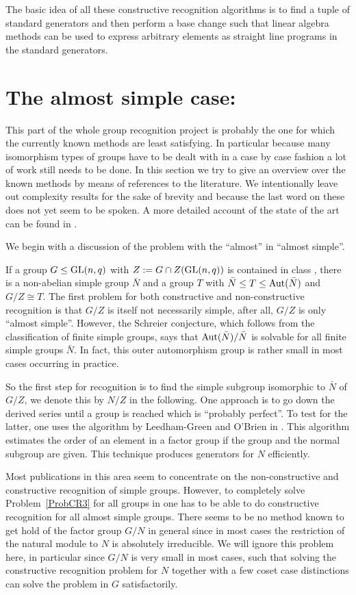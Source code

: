 The basic idea of all these constructive recognition algorithms is to find
a tuple of standard generators and then perform a base change
such that linear algebra methods can be used to express arbitrary
elements as straight line programs in the standard generators.


\section{The almost simple case: }
\label{solveD9}

This part of the whole group recognition project is probably the one
for which the currently known methods are least satisfying. In particular
because many isomorphism types of groups have to be dealt with in a case by
case fashion a lot of work still needs to be done.
In this section we try to give an overview over the known methods by
means of references to the literature. We intentionally leave out
complexity results for the sake of brevity and because the last word on
these does not yet seem to be spoken. A more detailed account of
the state of the art can be found in \cite{towards}.

We begin with a discussion of the problem with the ``almost'' in
``almost simple''.

If a group $G \le \GL(n,q)$ with $Z := G \cap Z(\GL(n,q))$ 
is contained in class , there is a
non-abelian simple group $\bar N$ and a group $T$ with $\bar N
\leq T \leq \Aut(\bar N)$ and $G/Z \cong T$. The first problem for
both constructive and non-constructive recognition is that $G/Z$ is
itself not necessarily simple, after all, $G/Z$ is only ``almost simple''.
However, the Schreier conjecture, which follows from the classification
of finite simple groups, says that $\Aut(\bar N) / \bar N$ is solvable
for all finite simple groups $\bar N$. In fact, this outer automorphism
group is rather small in most cases occurring in practice.

So the first step for recognition is to find the simple subgroup
isomorphic to $\bar N$ of $G/Z$, we denote this by $N/Z$ in the following. 
One approach is to go down the derived series
until a group is reached which is ``probably perfect''. To test for
the latter, one uses the algorithm by Leedham-Green and O'Brien in
\cite[5.3]{RecogTensInd}. This algorithm estimates the order of an element in a
factor group if the group and the normal subgroup are given.
This technique produces generators for $N$ efficiently.

Most publications in this area seem to concentrate on the
non-constructive and constructive recognition of simple groups.
However, to completely solve Problem~\ref{ProbCR3} for all groups in
 one has to be able to do constructive recognition for all
almost simple groups. There seems to be no method known to get hold of
the factor group $G/N$ in general since in most cases
the restriction of the natural module to $N$ is absolutely
irreducible.  We will ignore this problem here, in particular since $G/N$
is very small in most cases, such that solving the constructive recognition
problem for $N$ together with a few coset case distinctions can solve the
problem in $G$ satisfactorily.

